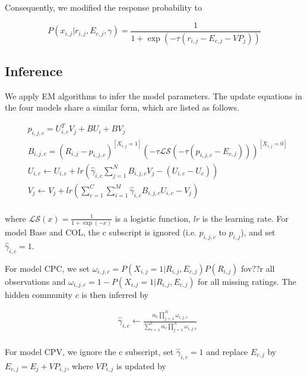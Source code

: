 \documentclass{sig-alternate}
\begin{document}
Consequently, we modified the response probability to

\begin{equation}\label{equ:responseCPV}
P(x_{i,j}|r_{i,j},E_{c,j},\gamma)=\frac{1}{1+\exp{(-\tau(r_{i,j}-E_{c,j}-VP_j))}}
\end{equation}



\subsection{Inference}

We apply EM algorithms to infer the model parameters. The update equations in the four models share a similar form, which are listed as follows. 

\begin{equation}\label{equ:update}
\begin{split}
&p_{i,j,c}=U_{i,c}^{T}V_{j} + BU_{i} + BV_{j} \\
&B_{i,j,c}=(R_{i,j}-p_{i,j,c})^{[X_{i,j}=1]}(-\tau \mathcal{LS}(-\tau(p_{i,j,c}-E_{c,j})))^{[X_{i,j}=0]} \\
&U_{i,c}\leftarrow U_{i,c}+lr(\hat{\gamma}_{i,c}\sum\limits_{j=1}^{N}B_{i,j,c}V_j-(U_{i,c}-U_c)) \\
&V_j\leftarrow V_j+lr(\sum\limits_{c=1}^{C}\sum\limits_{i=1}^{M}\hat{\gamma}_{i,c}B_{i,j,c}U_{i,c}-V_j) \\
\end{split}
\end{equation}

where $\mathcal{LS}(x)=\frac{1}{1+\exp(-x)}$ is a logistic function, $lr$ is the learning rate. For model Base and COL, the c subscript is ignored (i.e. $p_{i,j,c}$ to $p_{i,j}$), and set $\hat{\gamma}_{i,c}=1$. 

For model CPC, we set $\omega_{i,j,c}=P(X_{i,j}=1|R_{i,j},E_{c,j})P(R_{i,j})$ fov??r all observations and $\omega_{i,j,c}=1-P(X_{i,j}=1|R_{i,j},E_{c,j})$ for all missing ratings. The hidden community $c$ is then inferred by

\begin{equation}\label{equ:updateCPC}
\begin{split}
&\hat{\gamma}_{i,c}\leftarrow\frac{\alpha_c\prod_{j=1}^{N}\omega_{i,j,c}}{\sum_{c=1}^{C}\alpha_c\prod_{j=1}^{N}\omega_{i,j,c}} \\
\end{split}
\end{equation}

For  model CPV,  we ignore the c subscript, set $\hat{\gamma}_{i,c}=1$ and replace $E_{c,j}$ by $E_{c,j}=E_{j}+VP_{i,j}$, where $VP_{i,j}$ is updated by
\end{document}

